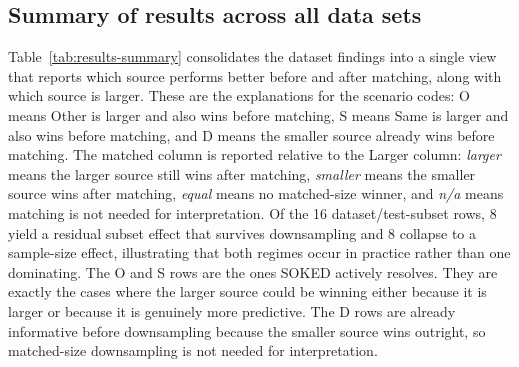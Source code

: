 \documentclass{article}
\begin{document}
\subsection{Summary of results across all data sets}
Table~\ref{tab:results-summary} consolidates the dataset findings into a single view that reports which source performs better before and after matching, along with which source is larger.
These are the explanations for the scenario codes: O means Other is larger and also wins before matching, S means Same is larger and also wins before matching, and D means the smaller source already wins before matching.
The matched column is reported relative to the Larger column: \emph{larger} means the larger source still wins after matching, \emph{smaller} means the smaller source wins after matching, \emph{equal} means no matched-size winner, and \emph{n/a} means matching is not needed for interpretation.
Of the 16 dataset/test-subset rows, 8 yield a residual subset effect that survives downsampling and 8 collapse to a sample-size effect, illustrating that both regimes occur in practice rather than one dominating.
The O and S rows are the ones SOKED actively resolves. 
They are exactly the cases where the larger source could be winning either because it is larger or because it is genuinely more predictive.
The D rows are already informative before downsampling because the smaller source wins outright, so matched-size downsampling is not needed for interpretation.
\end{document}
